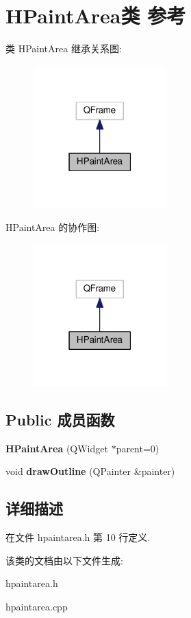 \section{H\+Paint\+Area类 参考}
\label{class_h_paint_area}


类 H\+Paint\+Area 继承关系图\+:\nopagebreak
\begin{figure}[H]
\begin{center}
\leavevmode
\includegraphics[width=147pt]{class_h_paint_area__inherit__graph}
\end{center}
\end{figure}


H\+Paint\+Area 的协作图\+:\nopagebreak
\begin{figure}[H]
\begin{center}
\leavevmode
\includegraphics[width=147pt]{class_h_paint_area__coll__graph}
\end{center}
\end{figure}
\subsection*{Public 成员函数}
\begin{DoxyCompactItemize}
\item 
{\bfseries H\+Paint\+Area} (Q\+Widget $\ast$parent=0)\label{class_h_paint_area_a1f22800864c1335ba9a284440d886297}

\item 
void {\bfseries draw\+Outline} (Q\+Painter \&painter)\label{class_h_paint_area_a6888e530cfb3ae1314a6c36c4f5a4e69}

\end{DoxyCompactItemize}


\subsection{详细描述}


在文件 hpaintarea.\+h 第 10 行定义.



该类的文档由以下文件生成\+:\begin{DoxyCompactItemize}
\item 
hpaintarea.\+h\item 
hpaintarea.\+cpp\end{DoxyCompactItemize}
